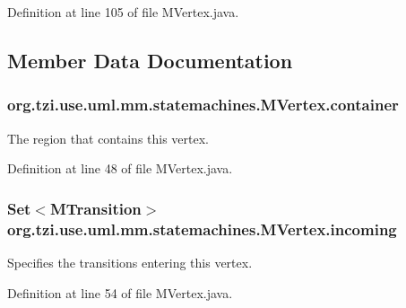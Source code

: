 Definition at line 105 of file M\-Vertex.\-java.



\subsection{Member Data Documentation}
\hypertarget{classorg_1_1tzi_1_1use_1_1uml_1_1mm_1_1statemachines_1_1_m_vertex_a6fac4b2809015693c6c39f1f874970aa}{
\subsubsection[{container}]{ org.\-tzi.\-use.\-uml.\-mm.\-statemachines.\-M\-Vertex.\-container\hspace{0.3cm}{\ttfamily [protected]}}}\label{classorg_1_1tzi_1_1use_1_1uml_1_1mm_1_1statemachines_1_1_m_vertex_a6fac4b2809015693c6c39f1f874970aa}
The region that contains this vertex. 

Definition at line 48 of file M\-Vertex.\-java.

\hypertarget{classorg_1_1tzi_1_1use_1_1uml_1_1mm_1_1statemachines_1_1_m_vertex_a487f5cd45570211cdd98ab752c9c5a28}{
\subsubsection[{incoming}]{\setlength{\rightskip}{0pt plus 5cm}Set$<${\bf M\-Transition}$>$ org.\-tzi.\-use.\-uml.\-mm.\-statemachines.\-M\-Vertex.\-incoming\hspace{0.3cm}{\ttfamily [protected]}}}\label{classorg_1_1tzi_1_1use_1_1uml_1_1mm_1_1statemachines_1_1_m_vertex_a487f5cd45570211cdd98ab752c9c5a28}
Specifies the transitions entering this vertex. 

Definition at line 54 of file M\-Vertex.\-java.

